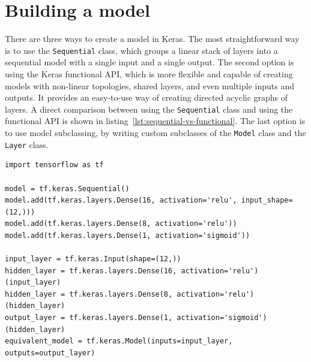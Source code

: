 \section{Building a model}
\label{building-a-model}
There are three ways to create a model in Keras.
The most straightforward way is to use the \texttt{Sequential} class, which groups
a linear stack of layers into a sequential model with a single input and a single output.
The second option is using the Keras functional API, which is more flexible and capable of creating
models with non-linear topologies, shared layers, and even multiple inputs and outputs.
It provides an easy-to-use way of creating directed acyclic graphs of layers.
A direct comparison between using the \texttt{Sequential} class and using the functional API is shown
in listing~\ref{lst:sequential-vs-functional}.
The last option is to use model subclassing, by writing custom subclasses of the \texttt{Model} class
and the \texttt{Layer} class.

\begin{lstlisting}[caption={An MLP binary classification model built using the \texttt{Sequential} class
and an equivalent model built using the functional API.}, label={lst:sequential-vs-functional}]
import tensorflow as tf

model = tf.keras.Sequential()
model.add(tf.keras.layers.Dense(16, activation='relu', input_shape=(12,)))
model.add(tf.keras.layers.Dense(8, activation='relu'))
model.add(tf.keras.layers.Dense(1, activation='sigmoid'))

input_layer = tf.keras.Input(shape=(12,))
hidden_layer = tf.keras.layers.Dense(16, activation='relu')(input_layer)
hidden_layer = tf.keras.layers.Dense(8, activation='relu')(hidden_layer)
output_layer = tf.keras.layers.Dense(1, activation='sigmoid')(hidden_layer)
equivalent_model = tf.keras.Model(inputs=input_layer, outputs=output_layer)
\end{lstlisting}



